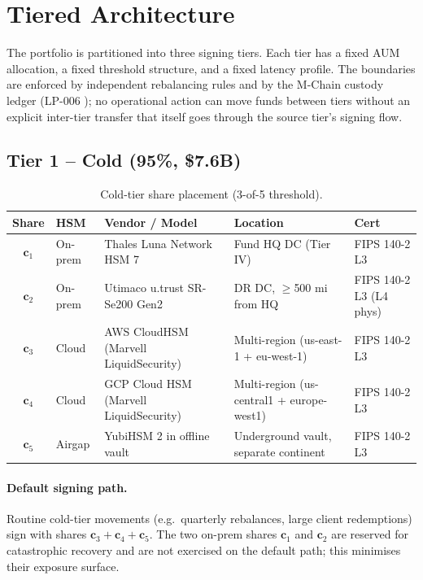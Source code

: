 \section{Tiered Architecture}

\label{sec:tiers}

The portfolio is partitioned into three signing tiers. Each tier has
a fixed AUM allocation, a fixed threshold structure, and a fixed
latency profile. The boundaries are enforced by independent rebalancing
rules and by the M-Chain custody ledger (LP-006 \cite{lp006}); no
operational action can move funds between tiers without an explicit
inter-tier transfer that itself goes through the source tier's
signing flow.

\subsection{Tier 1 -- Cold (95\%, \$7.6B)}

\begin{table}[h]
\centering
\small
\begin{tabular}{cllll}
\toprule
\textbf{Share} & \textbf{HSM} & \textbf{Vendor / Model} &
\textbf{Location} & \textbf{Cert} \\
\midrule
$\mathbf{c}_1$ & On-prem & Thales Luna Network HSM 7
  & Fund HQ DC (Tier IV) & FIPS 140-2 L3 \\
$\mathbf{c}_2$ & On-prem & Utimaco u.trust SR-Se200 Gen2
  & DR DC, $\geq$500 mi from HQ & FIPS 140-2 L3 (L4 phys) \\
$\mathbf{c}_3$ & Cloud   & AWS CloudHSM (Marvell LiquidSecurity)
  & Multi-region (us-east-1 + eu-west-1) & FIPS 140-2 L3 \\
$\mathbf{c}_4$ & Cloud   & GCP Cloud HSM (Marvell LiquidSecurity)
  & Multi-region (us-central1 + europe-west1) & FIPS 140-2 L3 \\
$\mathbf{c}_5$ & Airgap  & YubiHSM 2 in offline vault
  & Underground vault, separate continent & FIPS 140-2 L3 \\
\bottomrule
\end{tabular}
\caption{Cold-tier share placement (3-of-5 threshold).}
\label{tab:cold}
\end{table}

\paragraph{Default signing path.} Routine cold-tier movements (e.g.\
quarterly rebalances, large client redemptions) sign with shares
$\mathbf{c}_3 + \mathbf{c}_4 + \mathbf{c}_5$. The two on-prem shares
$\mathbf{c}_1$ and $\mathbf{c}_2$ are reserved for catastrophic
recovery and are not exercised on the default path; this minimises
their exposure surface.

